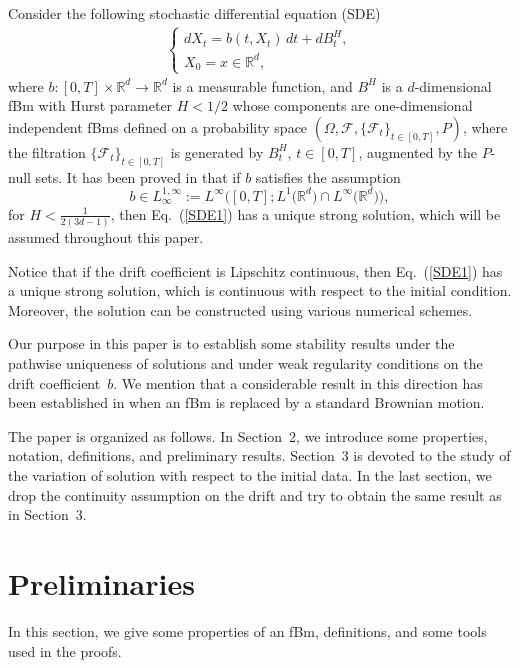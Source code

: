 \documentclass[numbers,compress,v1.0.1]{vmsta}
\def\R{{ \mathbb{R}}}
\theoremstyle{definition}
\begin{document}
Consider the following stochastic differential equation (SDE)
%
\begin{align}
\label{SDE1} %
\begin{cases}
dX_t = b(t,X_t)\,dt + dB^H_t,\\
X_0=x \in\R^d,
\end{cases} %
\end{align}
%
where $
b:[0,T]\times\R^d \rightarrow\R^d $ is a measurable function, and
$B^H$ is a $d$-dimensional fBm with Hurst parameter $H < 1/2$ whose
components are one-dimensional independent fBms defined on a
probability space $(\varOmega, \mathcal{F}, \{\mathcal{F}_t\}_{t\in[0,T]}, P)$,
where the filtration $\{\mathcal{F}_t\}_{t\in[0,T]}$ is generated by
$B^H_t$, $t\in[0,T]$, augmented by the $P$-null sets. It has been
proved in \cite{BNP} that if $b$ satisfies the assumption
%
\begin{equation}
\label{ass} b\in L_{\infty}^{1,\infty}:= L^\infty
\bigl([0,T]; L^1 \bigl(\mathbb{R}^{d}\bigr)\cap
L^\infty\bigl(\R^d\bigr)\bigr),
\end{equation}
%
for $H < \frac{1}{2(3d-1)}$, then Eq.~(\ref{SDE1}) has a unique strong
solution, which will be assumed throughout this paper.

Notice that if the drift coefficient is Lipschitz continuous, then
Eq.~(\ref{SDE1}) has a unique strong solution, which is continuous with
respect to the initial condition. Moreover, the solution can be
constructed using various numerical schemes.

Our purpose in this paper is to establish some stability results under
the pathwise uniqueness of solutions and under weak regularity
conditions on the drift coefficient~$b$. We mention that a considerable
result in this direction has been established in \cite{BMO} when an fBm
is replaced by a standard Brownian motion.

The paper is organized as follows. In Section~2, we introduce some
properties, notation, definitions, and preliminary results. Section~3
is devoted to the study of the variation of solution with respect to
the initial data. In the last section, we drop the continuity
assumption on the drift and try to obtain the same result as in Section~3.

\section{Preliminaries}
In this section, we give some properties of an fBm, definitions, and
some tools used in the proofs.
\end{document}
